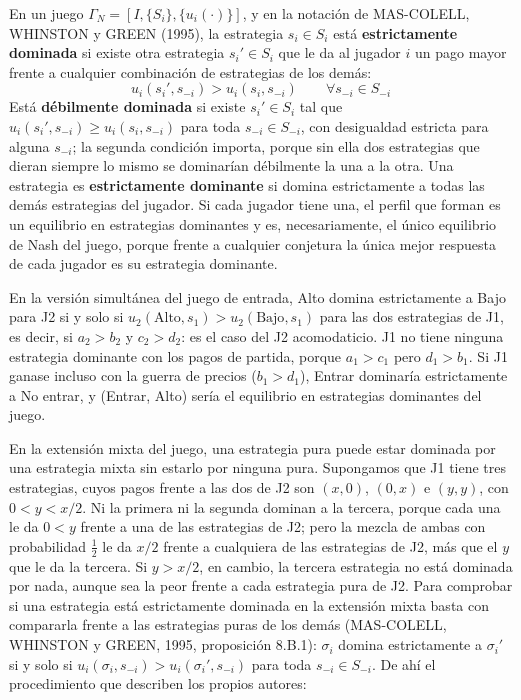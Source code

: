 \documentclass[10pt,a4paper]{article}
\begin{document}
En un juego $\Gamma_N=\left[I,\{S_i\},\{u_i(\cdot)\}\right]$, y en la notación de MAS-COLELL, WHINSTON y GREEN (1995), la estrategia $s_i\in S_i$ está \textbf{estrictamente dominada} si existe otra estrategia $s_i'\in S_i$ que le da al jugador $i$ un pago mayor frente a cualquier combinación de estrategias de los demás:
$$u_i(s_i',s_{-i})>u_i(s_i,s_{-i})\qquad\forall s_{-i}\in S_{-i}$$
Está \textbf{débilmente dominada} si existe $s_i'\in S_i$ tal que $u_i(s_i',s_{-i})\geq u_i(s_i,s_{-i})$ para toda $s_{-i}\in S_{-i}$, con desigualdad estricta para alguna $s_{-i}$; la segunda condición importa, porque sin ella dos estrategias que dieran siempre lo mismo se dominarían débilmente la una a la otra. Una estrategia es \textbf{estrictamente dominante} si domina estrictamente a todas las demás estrategias del jugador. Si cada jugador tiene una, el perfil que forman es un equilibrio en estrategias dominantes y es, necesariamente, el único equilibrio de Nash del juego, porque frente a cualquier conjetura la única mejor respuesta de cada jugador es su estrategia dominante.

En la versión simultánea del juego de entrada, Alto domina estrictamente a Bajo para J2 si y solo si $u_2(\text{Alto},s_1)>u_2(\text{Bajo},s_1)$ para las dos estrategias de J1, es decir, si $a_2>b_2$ y $c_2>d_2$: es el caso del J2 acomodaticio. J1 no tiene ninguna estrategia dominante con los pagos de partida, porque $a_1>c_1$ pero $d_1>b_1$. Si J1 ganase incluso con la guerra de precios ($b_1>d_1$), Entrar dominaría estrictamente a No entrar, y (Entrar, Alto) sería el equilibrio en estrategias dominantes del juego.

En la extensión mixta del juego, una estrategia pura puede estar dominada por una estrategia mixta sin estarlo por ninguna pura. Supongamos que J1 tiene tres estrategias, cuyos pagos frente a las dos de J2 son $(x,0)$, $(0,x)$ e $(y,y)$, con $0<y<x/2$. Ni la primera ni la segunda dominan a la tercera, porque cada una le da $0<y$ frente a una de las estrategias de J2; pero la mezcla de ambas con probabilidad $\tfrac{1}{2}$ le da $x/2$ frente a cualquiera de las estrategias de J2, más que el $y$ que le da la tercera. Si $y>x/2$, en cambio, la tercera estrategia no está dominada por nada, aunque sea la peor frente a cada estrategia pura de J2. Para comprobar si una estrategia está estrictamente dominada en la extensión mixta basta con compararla frente a las estrategias puras de los demás (MAS-COLELL, WHINSTON y GREEN, 1995, proposición 8.B.1): $\sigma_i$ domina estrictamente a $\sigma_i'$ si y solo si $u_i(\sigma_i,s_{-i})>u_i(\sigma_i',s_{-i})$ para toda $s_{-i}\in S_{-i}$. De ahí el procedimiento que describen los propios autores:
\end{document}
